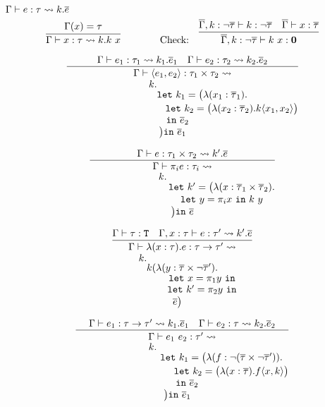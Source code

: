 \begin{judgment}
  $\Gamma \vdash e : \tau \leadsto k . \overline{e}$
  \[
    \infer
      {\Gamma \vdash x : \tau \leadsto k.k~x}
      {\Gamma(x) = \tau}
    \qquad
    \qquad
    \textnormal{Check:}
    \quad
    \infer
      {\Gammabar, k : \neg \taubar \vdash k~x : \mathbf{0}}
      {\Gammabar, k : \neg \taubar \vdash k : \neg \taubar
      &\Gammabar \vdash x : \taubar
      }
  \]

  \[
    \infer
      {\deduceinv
        {\Gamma \vdash \langle e_1, e_2 \rangle : \tau_1 \times \tau_2 \leadsto}
        {\deduceinv
          {k. \qqqquad}
          {\deduceinv
            {\qqquad \mathtt{let}~k_1 = \big(\lambda(x_1 : \taubar_1).}
            {\deduceinv
              {\qqqqqquad
                \mathtt{let}~k_2 = \big(\lambda(x_2 : \taubar_2). k\langle x_1, x_2 \rangle\big)}
              {\deduceinv
                {\mathtt{in}~\ebar_2 \quad}
                {\big) \mathtt{in}~\ebar_1 \qquad}}}}}}
      {\Gamma \vdash e_1 : \tau_1 \leadsto k_1.\ebar_1
      &\Gamma \vdash e_2 : \tau_2 \leadsto k_2.\ebar_2
      }
  \]

 \[
   \infer
     {\deduceinv
       {\Gamma \vdash \pi_ie : \tau_i \leadsto}
       {\deduceinv
         {k. \qqquad}
         {\deduceinv
           {\qqqqquad \mathtt{let}~k' = \big(\lambda(x : \taubar_1 \times \taubar_2).}
           {\deduceinv
             {\qqqqquad \letv{y}{\pi_i x}{k~y}}
             {\big) \mathtt{in}~\ebar}}}}}
    {\Gamma \vdash e : \tau_1 \times \tau_2 \leadsto k'.\ebar}
 \]

 \[
   \infer
     {\deduceinv
       {\Gamma \vdash \lambda(x : \tau).e : \tau \to \tau' \leadsto}
       {\deduceinv
         {k.\qqqqquad}
         {\deduceinv
           {k(\lambda (y : \taubar \times \neg \taubar').}
           {\deduceinv
             {\qqquad \mathtt{let}~x = \pi_1 y~\mathtt{in}}
             {\deduceinv
               {\qqquad \mathtt{let}~k' = \pi_2 y~\mathtt{in}}
               {\ebar\big) \quad}}}}}}
    {\Gamma \vdash \tau : \T
    &\Gamma, x : \tau \vdash e : \tau' \leadsto k'.\ebar}
 \]

 \[
   \infer
     {\deduceinv
       {\Gamma \vdash e_1~e_2 : \tau' \leadsto}
       {\deduceinv
         {k. \qqqquad}
         {\deduceinv
           {\qqqqquad \mathtt{let}~k_1 = \big(\lambda (f : \neg(\taubar \times \neg \taubar')).}
           {\deduceinv
             {\qqqqqquad \mathtt{let}~k_2 = \big( \lambda(x : \taubar). f\langle x, k \rangle \big)}
             {\deduceinv
               {\quad \mathtt{in}~\ebar_2}
               {\big) \mathtt{in}~\ebar_1 \quad}}}}}}
    {\Gamma \vdash e_1 : \tau \to \tau' \leadsto k_1.\ebar_1
    &\Gamma \vdash e_2 : \tau \leadsto k_2. \ebar_2
    }
 \]


\end{judgment}
